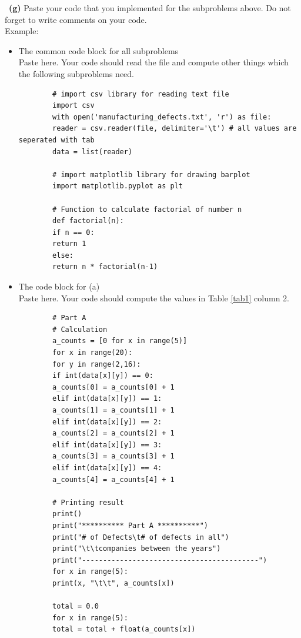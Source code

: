 \documentclass[a4 paper]{article}
\numberwithin{equation}{section}
\newcommand{\subproblem}[1]{~\newline\textbf{(#1)}}
\newcommand{\0}{\mathbf{0}}
\begin{document}
	\subproblem{g} Paste your code that you implemented for the subproblems above. Do not forget to write comments on your code.\\
	Example:\\
	\begin{itemize}
		\item The common code block for all subproblems\\
		Paste here. Your code should read the file and compute other things which the following subproblems need.

		\lstset{language=Python}
		\lstset{frame=lines}
		\lstset{basicstyle=\footnotesize}
		\begin{lstlisting}
		# import csv library for reading text file
		import csv
		with open('manufacturing_defects.txt', 'r') as file:
		reader = csv.reader(file, delimiter='\t') # all values are seperated with tab
		data = list(reader)
		
		# import matplotlib library for drawing barplot
		import matplotlib.pyplot as plt
		
		# Function to calculate factorial of number n
		def factorial(n):
		if n == 0:
		return 1
		else:
		return n * factorial(n-1)
		\end{lstlisting}

		\item The code block for (a)\\
		Paste here. Your code should compute the values in Table \ref{tab1} column 2.
		\lstset{language=Python}
		\lstset{frame=lines}
		\lstset{basicstyle=\footnotesize}
		\begin{lstlisting}
		# Part A
		# Calculation
		a_counts = [0 for x in range(5)]
		for x in range(20):
		for y in range(2,16):
		if int(data[x][y]) == 0:
		a_counts[0] = a_counts[0] + 1
		elif int(data[x][y]) == 1:
		a_counts[1] = a_counts[1] + 1
		elif int(data[x][y]) == 2:
		a_counts[2] = a_counts[2] + 1
		elif int(data[x][y]) == 3:
		a_counts[3] = a_counts[3] + 1
		elif int(data[x][y]) == 4:
		a_counts[4] = a_counts[4] + 1
		
		# Printing result
		print()
		print("********** Part A **********")
		print("# of Defects\t# of defects in all")
		print("\t\tcompanies between the years")
		print("------------------------------------------")
		for x in range(5):
		print(x, "\t\t", a_counts[x])
		
		total = 0.0
		for x in range(5):
		total = total + float(a_counts[x])
		\end{lstlisting}
		

\end{itemize}
\end{document}
